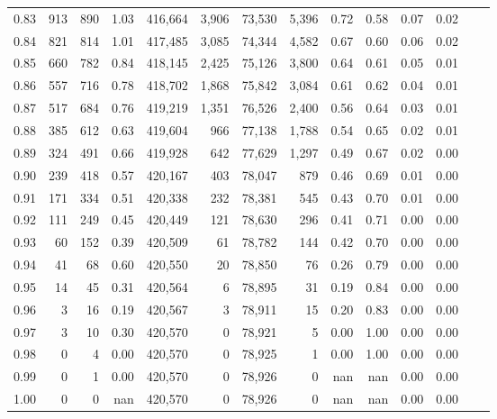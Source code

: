 \begin{tabular}{rrrrrrrrrrrrrr}
0.83 &    913 &    890 &    1.03 &  416,664 &    3,906 &  73,530 &   5,396 &  0.72 &  0.58 &  0.07 &      0.02 \\
0.84 &    821 &    814 &    1.01 &  417,485 &    3,085 &  74,344 &   4,582 &  0.67 &  0.60 &  0.06 &      0.02 \\
0.85 &    660 &    782 &    0.84 &  418,145 &    2,425 &  75,126 &   3,800 &  0.64 &  0.61 &  0.05 &      0.01 \\
0.86 &    557 &    716 &    0.78 &  418,702 &    1,868 &  75,842 &   3,084 &  0.61 &  0.62 &  0.04 &      0.01 \\
0.87 &    517 &    684 &    0.76 &  419,219 &    1,351 &  76,526 &   2,400 &  0.56 &  0.64 &  0.03 &      0.01 \\
0.88 &    385 &    612 &    0.63 &  419,604 &      966 &  77,138 &   1,788 &  0.54 &  0.65 &  0.02 &      0.01 \\
0.89 &    324 &    491 &    0.66 &  419,928 &      642 &  77,629 &   1,297 &  0.49 &  0.67 &  0.02 &      0.00 \\
0.90 &    239 &    418 &    0.57 &  420,167 &      403 &  78,047 &     879 &  0.46 &  0.69 &  0.01 &      0.00 \\
0.91 &    171 &    334 &    0.51 &  420,338 &      232 &  78,381 &     545 &  0.43 &  0.70 &  0.01 &      0.00 \\
0.92 &    111 &    249 &    0.45 &  420,449 &      121 &  78,630 &     296 &  0.41 &  0.71 &  0.00 &      0.00 \\
0.93 &     60 &    152 &    0.39 &  420,509 &       61 &  78,782 &     144 &  0.42 &  0.70 &  0.00 &      0.00 \\
0.94 &     41 &     68 &    0.60 &  420,550 &       20 &  78,850 &      76 &  0.26 &  0.79 &  0.00 &      0.00 \\
0.95 &     14 &     45 &    0.31 &  420,564 &        6 &  78,895 &      31 &  0.19 &  0.84 &  0.00 &      0.00 \\
0.96 &      3 &     16 &    0.19 &  420,567 &        3 &  78,911 &      15 &  0.20 &  0.83 &  0.00 &      0.00 \\
0.97 &      3 &     10 &    0.30 &  420,570 &        0 &  78,921 &       5 &  0.00 &  1.00 &  0.00 &      0.00 \\
0.98 &      0 &      4 &    0.00 &  420,570 &        0 &  78,925 &       1 &  0.00 &  1.00 &  0.00 &      0.00 \\
0.99 &      0 &      1 &    0.00 &  420,570 &        0 &  78,926 &       0 &   nan &   nan &  0.00 &      0.00 \\
1.00 &      0 &      0 &     nan &  420,570 &        0 &  78,926 &       0 &   nan &   nan &  0.00 &      0.00 \\
\bottomrule
\end{tabular}
